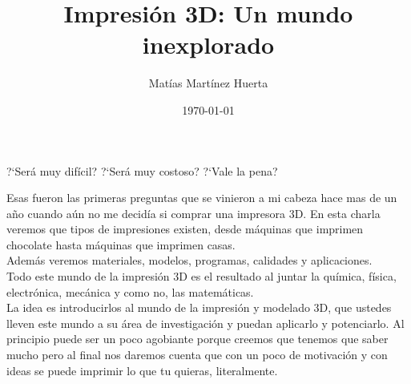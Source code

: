 \documentclass{article}
\title{Impresi\'on 3D: Un mundo inexplorado}
\author{Mat\'ias Mart\'inez Huerta}
\date{\today}
\begin{document}
\maketitle
\begin{abstract}
\end{abstract}
\begin{center}
?`Ser\'a muy dif\'icil? ?`Ser\'a muy costoso? ?`Vale la pena? \\
\end{center}
Esas fueron las primeras preguntas que se vinieron a mi cabeza hace mas de un a\~no cuando a\'un no me decid\'ia si comprar una impresora 3D.
En esta charla veremos que tipos de impresiones existen, desde m\'aquinas que imprimen chocolate hasta m\'aquinas que imprimen casas.\\
Adem\'as veremos materiales, modelos, programas, calidades y aplicaciones.\\ 
Todo este mundo de la impresi\'on 3D es el resultado al juntar la qu\'imica, f\'isica, electr\'onica, mec\'anica y como no, las matem\'aticas.\\ 
La idea es introducirlos al mundo de la impresi\'on y modelado 3D, que ustedes lleven este mundo a su \'area de investigaci\'on y puedan aplicarlo y potenciarlo.
Al principio puede ser un poco agobiante porque creemos que tenemos que saber mucho pero al final nos daremos cuenta que con un poco de motivaci\'on y con ideas se puede imprimir lo que tu quieras, literalmente.
\end{document}
